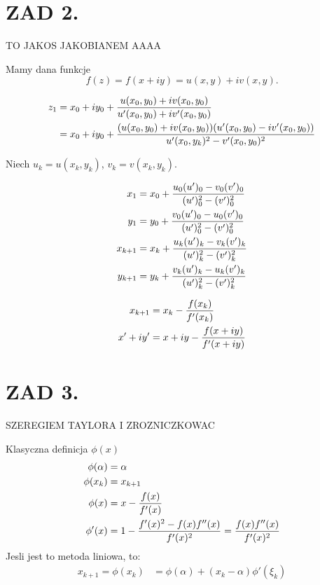 \documentclass{article}[16pt]
\begin{document}
    \section*{ZAD 2.}

    TO JAKOS JAKOBIANEM AAAA
    \bigskip

    Mamy dana funkcje
    $$f(z)=f(x+iy)=u(x,y)+iv(x,y).$$

    \begin{align*}
        z_1&=x_0+iy_0+{u(x_0,y_0)+iv(x_0,y_0)\over u'(x_0,y_0)+iv'(x_0,y_0)}\\
        &=x_0+iy_0+{(u(x_0,y_0)+iv(x_0,y_0))(u'(x_0,y_0)-iv'(x_0,y_0))\over u'(x_0,y_k)^2-v'(x_0,y_0)^2}
    \end{align*}
    
    Niech $u_k=u(x_k,y_k)$, $v_k=v(x_k,y_k)$.

    \begin{align*}
        x_{1}&=x_0+{u_0(u')_0-v_0(v')_0\over (u')_0^2-(v')_0^2}\\
        y_{1}&=y_0+{v_0(u')_0-u_0(v')_0\over (u')_0^2-(v')_0^2}\\
        x_{k+1}&=x_k+{u_k(u')_k-v_k(v')_k\over (u')_k^2-(v')_k^2}\\
        y_{k+1}&=y_k+{v_k(u')_k-u_k(v')_k\over (u')_k^2-(v')_k^2}
    \end{align*}

    \begin{align*}
        x_{k+1}&=x_k-{f(x_k)\over f'(x_k)}\\
        x'+iy'&=x+iy-{f(x+iy)\over f'(x+iy)}
    \end{align*}

    \section*{ZAD 3.}

    SZEREGIEM TAYLORA I ZROZNICZKOWAC
    \bigskip

    Klasyczna definicja $\phi(x)$
    \begin{align*}
        \phi(\alpha)&=\alpha\\
        \phi(x_k)&=x_{k+1}\\
        \phi(x)&=x-{f(x)\over f'(x)}\\
        \phi'(x)&=1-{f'(x)^2-f(x)f''(x)\over f'(x)^2}={f(x)f''(x)\over f'(x)^2}
    \end{align*}
    Jesli jest to metoda liniowa, to:
    \begin{align*}
        x_{k+1}=\phi(x_k)&=\phi(\alpha)+(x_k-\alpha)\phi'(\xi_k)
    \end{align*}
\end{document}
